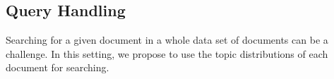 \subsection{Query Handling}
Searching for a given document in a whole data set of documents can be a challenge. 
In this setting, we propose to use the topic distributions of each document for searching.
 
